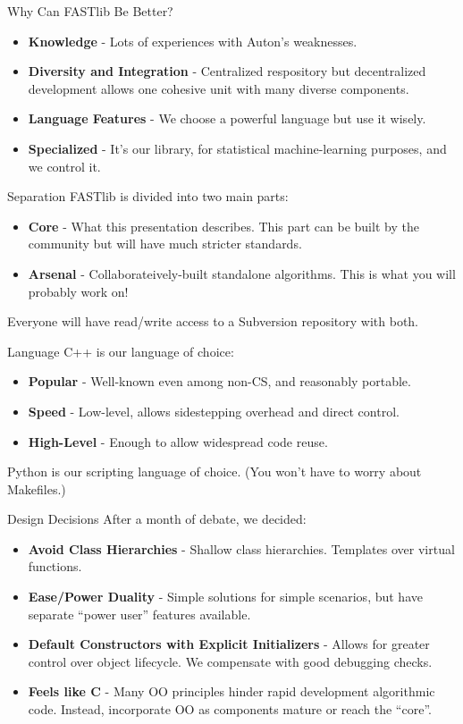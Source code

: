 \documentclass[pdf,colorBG,slideColor]{prosper}
\newcommand{\itemt}[1]{\item {\bf #1} -}
\begin{document}
\begin{slide}{Why Can FASTlib Be Better?}
 \begin{itemize}
  \itemt{Knowledge} Lots of experiences with Auton's weaknesses.
  \itemt{Diversity and Integration}
  Centralized respository but decentralized development allows one cohesive unit with many diverse components.
  \itemt{Language Features}
  We choose a powerful language but use it wisely.
  \itemt{Specialized} It's our library, for statistical machine-learning purposes, and we control it.
 \end{itemize}
\end{slide}

\begin{slide}{Separation}
 FASTlib is divided into two main parts:
 \begin{itemize}
 \itemt{Core} What this presentation describes.  This part can be built by
 the community but will have much stricter standards.
 \itemt{Arsenal} Collaborateively-built standalone algorithms.
 This is what you will probably work on!
 \end{itemize}
 Everyone will have read/write access to a Subversion repository with both.
\end{slide}

\begin{slide}{Language}
 C++ is our language of choice:
 \begin{itemize}
 \itemt{Popular} Well-known even among non-CS, and reasonably portable.
 \itemt{Speed} Low-level, allows sidestepping overhead and direct control.
 \itemt{High-Level} Enough to allow widespread code reuse.
 \end{itemize}
 Python is our scripting language of choice.
 (You won't have to worry about Makefiles.)
\end{slide}

\begin{slide}{Design Decisions}
 After a month of debate, we decided:
 \begin{itemize}
  \itemt{Avoid Class Hierarchies}
  Shallow class hierarchies.  Templates over virtual functions.
  \itemt{Ease/Power Duality}
  Simple solutions for simple scenarios, but have separate ``power user'' features available.
  \itemt{Default Constructors with Explicit Initializers}
  Allows for greater control over object lifecycle.
  We compensate with good debugging checks.
  \itemt{Feels like C}
  Many OO principles hinder rapid development algorithmic code.
  Instead, incorporate OO as components mature or reach the ``core''.
 \end{itemize}
\end{slide}
\end{document}
